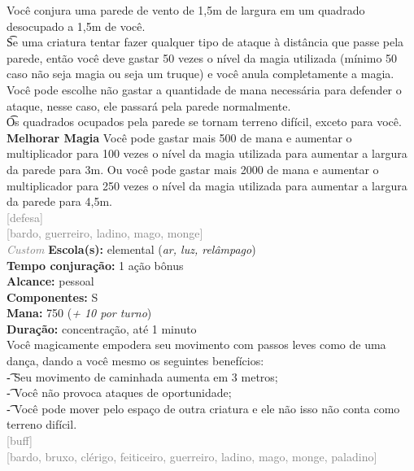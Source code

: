 \documentclass{RPG_Adventure}[2021/10/20]
\begin{document}
{\normalsize Você conjura uma parede de vento de 1,5m de largura em um quadrado desocupado a 1,5m de você.\\\t Se uma criatura tentar fazer qualquer tipo de ataque à distância que passe pela parede, então você deve gastar 50 vezes o nível da magia utilizada (mínimo 50 caso não seja magia ou seja um truque) e você anula completamente a magia. Você pode escolhe não gastar a quantidade de mana necessária para defender o ataque, nesse caso, ele passará pela parede normalmente.\\\t Os quadrados ocupados pela parede se tornam terreno difícil, exceto para você.\\\t \textbf{Melhorar Magia} Você pode gastar mais 500 de mana e aumentar o multiplicador para 100 vezes o nível da magia utilizada para aumentar a largura da parede para 3m. Ou você pode gastar mais 2000 de mana e aumentar o multiplicador para 250 vezes o nível da magia utilizada para aumentar a largura da parede para 4,5m.\\}
{\scriptsize \textcolor{gray}{[defesa]\\}}
{\scriptsize \textcolor{gray}{[bardo, guerreiro, ladino, mago, monge]\\}}
{\tiny \textcolor{gray}{\textit{Custom}}}
{\small \t \textbf{Escola(s):} elemental (\textit{ar, luz, relâmpago})\\\t \textbf{Tempo conjuração:} 1 ação bônus\\\t \textbf{Alcance:} pessoal\\\t \textbf{Componentes:} S\\\t \textbf{Mana:} 750 (\textit{+ 10 por turno})\\\t \textbf{Duração:} concentração, até 1 minuto\\}
{\normalsize Você magicamente empodera seu movimento com passos leves como de uma dança, dando a você mesmo os seguintes benefícios:\\\t - Seu movimento de caminhada aumenta em 3 metros;\\\t - Você não provoca ataques de oportunidade;\\\t - Você pode mover pelo espaço de outra criatura e ele não isso não conta como terreno difícil.\\}
{\scriptsize \textcolor{gray}{[buff]\\}}
{\scriptsize \textcolor{gray}{[bardo, bruxo, clérigo, feiticeiro, guerreiro, ladino, mago, monge, paladino]\\}}
\end{document}
